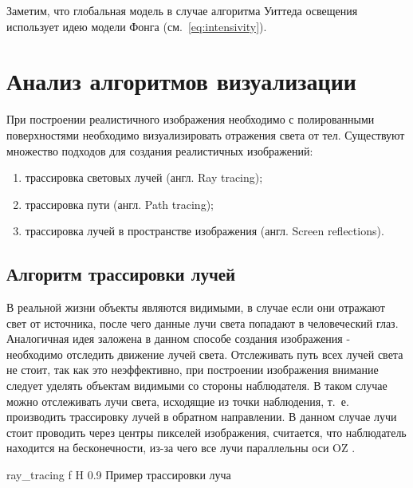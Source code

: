 Заметим, что глобальная модель в случае алгоритма Уиттеда освещения использует идею модели Фонга (см.~\ref{eq:intensivity}).






\section{Анализ алгоритмов визуализации}




При построении реалистичного изображения необходимо с полированными поверхностями необходимо визуализировать отражения света от тел.
Существуют множество подходов для создания реалистичных изображений:
\begin{enumerate}
	\item трассировка световых лучей (англ. Ray tracing);
	\item трассировка пути (англ. Path  tracing);
	\item трассировка лучей в пространстве изображения (англ. Screen reflections).
\end{enumerate}





\subsection{Алгоритм трассировки лучей}
\label{sec:ray_tracing}
В реальной жизни объекты являются видимыми, в случае если они отражают свет от источника, после чего данные лучи света попадают в человеческий глаз. Аналогичная идея заложена в данном способе создания изображения - необходимо отследить движение лучей света.
Отслеживать путь всех лучей света не стоит, так как это неэффективно, при построении изображения внимание следует уделять объектам видимыми со стороны наблюдателя.
В таком случае можно отслеживать лучи света, исходящие из точки наблюдения, т.~е. производить трассировку лучей в обратном направлении. В данном случае лучи стоит проводить через центры пикселей изображения,
считается, что наблюдатель находится на бесконечности, из-за чего все лучи параллельны оси OZ \cite{Rodgers,modern_ray_tracing}.




{ray_tracing} %
{f} %
{H} %
{0.9\textwidth} %
{Пример трассировки луча} %







